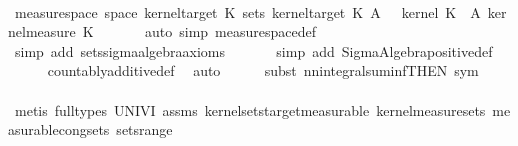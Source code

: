 \begin{isabellebody}
\ \ \isamarkupfalse%
\ \isamarkupfalse%
\ {\isachardoublequoteopen}measure{\isacharunderscore}{\kern0pt}space\ {\isacharparenleft}{\kern0pt}space\ {\isacharparenleft}{\kern0pt}kernel{\isacharunderscore}{\kern0pt}target\ K\ {\isacharparenleft}{\kern0pt}sets\ {\isacharparenleft}{\kern0pt}kernel{\isacharunderscore}{\kern0pt}target\ K\ {\isacharparenleft}{\kern0pt}{\isasymlambda}A{\isacharprime}{\kern0pt}{\isachardot}{\kern0pt}\ {\isasymintegral}\isactrlsup {\isacharplus}{\kern0pt}\ {\isasymomega}\ kernel\ K\ {\isasymomega}\ A{\isacharprime}{\kern0pt}\ {\isasympartial}kernel{\isacharunderscore}{\kern0pt}measure\ K\ {\isasymomega}{\isacharparenright}{\kern0pt}{\isachardoublequoteclose}\isanewline
\ \ \ \ \isamarkupfalse%
\ {\isacharparenleft}{\kern0pt}auto\ simp{\isacharcolon}{\kern0pt}\ measure{\isacharunderscore}{\kern0pt}space{\isacharunderscore}{\kern0pt}def{\isacharparenright}{\kern0pt}\isanewline
\ \ \ \ \ \ \isamarkupfalse%
\ {\isacharparenleft}{\kern0pt}simp\ add{\isacharcolon}{\kern0pt}\ sets{\isachardot}{\kern0pt}sigma{\isacharunderscore}{\kern0pt}algebra{\isacharunderscore}{\kern0pt}axioms{\isacharparenright}{\kern0pt}\isanewline
\ \ \ \ \ \isamarkupfalse%
\ {\isacharparenleft}{\kern0pt}simp\ add{\isacharcolon}{\kern0pt}\ Sigma{\isacharunderscore}{\kern0pt}Algebra{\isachardot}{\kern0pt}positive{\isacharunderscore}{\kern0pt}def{\isacharparenright}{\kern0pt}\isanewline
\ \ \ \ \isamarkupfalse%
\ countably{\isacharunderscore}{\kern0pt}additive{\isacharunderscore}{\kern0pt}def\ \isamarkupfalse%
\ auto\isanewline
\ \ \ \ \isamarkupfalse%
\ {\isacharparenleft}{\kern0pt}subst\ nn{\isacharunderscore}{\kern0pt}integral{\isacharunderscore}{\kern0pt}suminf{\isacharbrackleft}{\kern0pt}THEN\ sym{\isacharbrackright}{\kern0pt}{\isacharparenright}{\kern0pt}\isanewline
\ \ \ \ \ \isamarkupfalse%
\ {\isacharparenleft}{\kern0pt}metis\ {\isacharparenleft}{\kern0pt}full{\isacharunderscore}{\kern0pt}types{\isacharparenright}{\kern0pt}\ UNIV{\isacharunderscore}{\kern0pt}I\ assms{\isacharparenleft}{\kern0pt}{}{\isacharparenright}{\kern0pt}\ kernel{\isachardot}{\kern0pt}sets{\isacharunderscore}{\kern0pt}target{\isacharunderscore}{\kern0pt}measurable\ kernel{\isacharunderscore}{\kern0pt}measure{\isacharunderscore}{\kern0pt}sets\ measurable{\isacharunderscore}{\kern0pt}cong{\isacharunderscore}{\kern0pt}sets\ sets{\isacharunderscore}{\kern0pt}range{\isacharparenright}{\kern0pt}\isanewline

\end{isabellebody}
